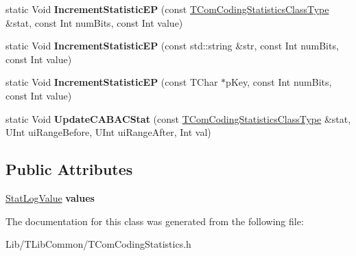\begin{DoxyCompactItemize}
static Void {\bfseries Increment\+Statistic\+EP} (const \hyperlink{class_t_com_coding_statistics_class_type}{T\+Com\+Coding\+Statistics\+Class\+Type} \&stat, const Int num\+Bits, const Int value)
\item 
\mbox{\label{class_t_com_coding_statistics_a08a76f4c094ae457a84e1db69fac4567}} 
static Void {\bfseries Increment\+Statistic\+EP} (const std\+::string \&str, const Int num\+Bits, const Int value)
\item 
\mbox{\label{class_t_com_coding_statistics_a813774a335aa1d477672d910f8989ea0}} 
static Void {\bfseries Increment\+Statistic\+EP} (const T\+Char $\ast$p\+Key, const Int num\+Bits, const Int value)
\item 
\mbox{\label{class_t_com_coding_statistics_aabc47895b6bc0cd15674f2d5bb0fc4db}} 
static Void {\bfseries Update\+C\+A\+B\+A\+C\+Stat} (const \hyperlink{class_t_com_coding_statistics_class_type}{T\+Com\+Coding\+Statistics\+Class\+Type} \&stat, U\+Int ui\+Range\+Before, U\+Int ui\+Range\+After, Int val)
\end{DoxyCompactItemize}
\subsection*{Public Attributes}
\begin{DoxyCompactItemize}
\item 
\mbox{\label{class_t_com_coding_statistics_af2f2eba035ef777ceebc25c606a3e6f7}} 
\hyperlink{struct_t_com_coding_statistics_1_1_stat_log_value}{Stat\+Log\+Value} {\bfseries values}
\end{DoxyCompactItemize}


The documentation for this class was generated from the following file\+:\begin{DoxyCompactItemize}
\item 
Lib/\+T\+Lib\+Common/T\+Com\+Coding\+Statistics.\+h\end{DoxyCompactItemize}
